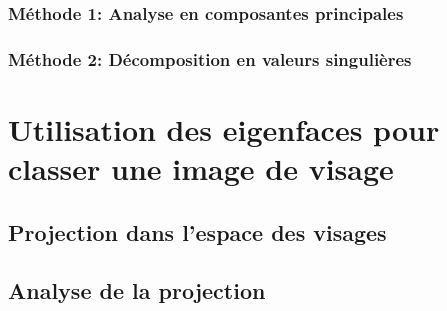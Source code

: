 \documentclass[12pt,french]{article}
\begin{document}
\subsubsection{Méthode 1: Analyse en composantes principales}
\subsubsection{Méthode 2: Décomposition en valeurs singulières}
\section{Utilisation des eigenfaces pour classer une image de visage}
\subsection{Projection dans l'espace des visages}
\subsection{Analyse de la projection}
\end{document}

